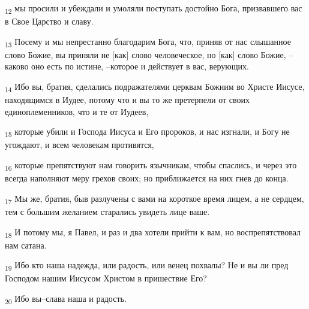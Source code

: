 \begin{tcolorbox}
\textsubscript{12} мы просили и убеждали и умоляли поступать достойно Бога, призвавшего вас в Свое Царство и славу.
\end{tcolorbox}
\begin{tcolorbox}
\textsubscript{13} Посему и мы непрестанно благодарим Бога, что, приняв от нас слышанное слово Божие, вы приняли не [как] слово человеческое, но [как] слово Божие, --каково оно есть по истине, --которое и действует в вас, верующих.
\end{tcolorbox}
\begin{tcolorbox}
\textsubscript{14} Ибо вы, братия, сделались подражателями церквам Божиим во Христе Иисусе, находящимся в Иудее, потому что и вы то же претерпели от своих единоплеменников, что и те от Иудеев,
\end{tcolorbox}
\begin{tcolorbox}
\textsubscript{15} которые убили и Господа Иисуса и Его пророков, и нас изгнали, и Богу не угождают, и всем человекам противятся,
\end{tcolorbox}
\begin{tcolorbox}
\textsubscript{16} которые препятствуют нам говорить язычникам, чтобы спаслись, и через это всегда наполняют меру грехов своих; но приближается на них гнев до конца.
\end{tcolorbox}
\begin{tcolorbox}
\textsubscript{17} Мы же, братия, быв разлучены с вами на короткое время лицем, а не сердцем, тем с большим желанием старались увидеть лице ваше.
\end{tcolorbox}
\begin{tcolorbox}
\textsubscript{18} И потому мы, я Павел, и раз и два хотели прийти к вам, но воспрепятствовал нам сатана.
\end{tcolorbox}
\begin{tcolorbox}
\textsubscript{19} Ибо кто наша надежда, или радость, или венец похвалы? Не и вы ли пред Господом нашим Иисусом Христом в пришествие Его?
\end{tcolorbox}
\begin{tcolorbox}
\textsubscript{20} Ибо вы--слава наша и радость.
\end{tcolorbox}
